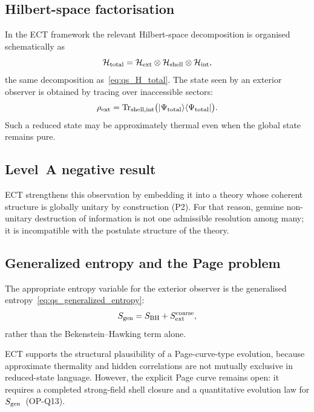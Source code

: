 \documentclass[11pt,a4paper]{article}
\numberwithin{equation}{section}
\begin{document}
\subsection*{Hilbert-space factorisation}

In the ECT framework the relevant Hilbert-space decomposition is
organised schematically as
\begin{equation}
  \label{eq:app_H_total}
  \mathcal{H}_{\rm total}
  =
  \mathcal{H}_{\rm ext}
  \otimes
  \mathcal{H}_{\rm shell}
  \otimes
  \mathcal{H}_{\rm int},
\end{equation}
the same decomposition as~\eqref{eq:qs_H_total}.
The state seen by an exterior observer is obtained by tracing over
inaccessible sectors:
\begin{equation}
  \label{eq:app_rho_ext}
  \rho_{\rm ext}
  =
  \mathrm{Tr}_{{\rm shell,int}}
  \bigl(|\Psi_{\rm total}\rangle\langle\Psi_{\rm total}|\bigr).
\end{equation}
Such a reduced state may be approximately thermal even when the global
state remains pure.

\subsection*{Level~A negative result}

ECT strengthens this observation by embedding it into a theory whose
coherent structure is globally unitary by construction (P2).
For that reason, genuine non-unitary destruction of information is not
one admissible resolution among many; it is incompatible with the
postulate structure of the theory.

\subsection*{Generalized entropy and the Page problem}

The appropriate entropy variable for the exterior observer is the
generalised entropy~\eqref{eq:qs_generalized_entropy}:
\[
  S_{\rm gen}
  = S_{\rm BH} + S_{\rm ext}^{\rm coarse},
\]
rather than the Bekenstein--Hawking term alone.

ECT supports the structural plausibility of a Page-curve-type evolution,
because approximate thermality and hidden correlations are not mutually
exclusive in reduced-state language.
However, the explicit Page curve remains open: it requires a completed
strong-field shell closure and a quantitative evolution law for
$S_{\rm gen}$~(OP-Q13).
\end{document}
